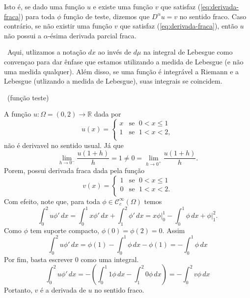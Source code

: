 \documentclass[a4paper, 11pt]{book}
\theoremstyle{definition}
\newcommand{\obs}{\noindent{\textbf{\textcolor{black}{\sffamily Observação:}}}~}
\newcommand{\bR}{\mathbb{R}}
\newcommand{\cC}{\mathcal{C}}
\begin{document}
Isto é, se dado uma função $u$ e existe uma função $v$ que satisfaz (\ref{eq:derivada-fraca}) para toda $\phi$ função de teste, dizemos que $D^\alpha u = v$ no sentido fraco.
Caso contrário, se não existir uma função $v$ que satisfaz (\ref{eq:derivada-fraca}), então $u$ não possui a $\alpha$-ésima derivada parcial fraca.

\obs Aqui, utlizamos a notação $dx$ ao invés de $d\mu$ na integral de Lebesgue como convençao para dar ênfase que estamos utilizando a medida de Lebesgue (e não uma medida qualquer).
Além disso, se uma função é integrável a Riemann e a Lebesgue (utlizando a medida de Lebesgue), suas integrais se coincidem.

\obs (função teste)

\begin{ex} \label{ex:derivada-fraca-R}
    A função $u : \Omega  =(0,2) \to \bR$ dada por
    \[
        u(x) = \left\{
            \begin{array}{rl}
                x & \text{se }\; 0 < x \leqslant 1\\
                1 & \text{se }\; 1 < x < 2,\\
            \end{array}
        \right.
    \]
    não é derivavel no sentido usual. Já que
    \[
        \lim_{h\to0^-} \frac{u(1 + h)}{h} = 1 \neq 0 = \lim_{h\to0^+} \frac{u(1 + h)}{h}.
    \]
    Porem, possui derivada fraca dada pela função
    \[
        v(x) = \left\{
            \begin{array}{rl}
                1 & \text{se }\; 0 < x \leqslant 1\\
                0 & \text{se }\; 1 < x < 2.\\
            \end{array}
        \right.
    \]
    Com efeito, note que, para toda $\phi \in \cC^\infty_c(\Omega)$ temos
    \[
        \int_0^2 u \phi' \,dx = \int_0^1 x \phi' \,dx + \int_1^2 \phi' \,dx = x \phi \bigg|_0^1 - \int_0^1 \phi \,dx + \phi \bigg|_1^2.
    \]
    Como $\phi$ tem suporte compacto, $\phi(0) = \phi(2) = 0$. Assim
    \[
        \int_0^2 u \phi' \,dx = \phi(1) - \int_0^1 \phi \,dx - \phi(1) = -\int_0^1 \phi \,dx
    \]
    Por fim, basta escrever $0$ como uma integral.
    \[
        \int_0^2 u \phi' \,dx = - \left(  \int_0^1 1\phi \, dx - \int_1^2 0\phi \,dx  \right) = -\int_0^2 v \phi \,dx
    \]
    Portanto, $v$ é a derivada de $u$ no sentido fraco.
\end{ex}
\end{document}
